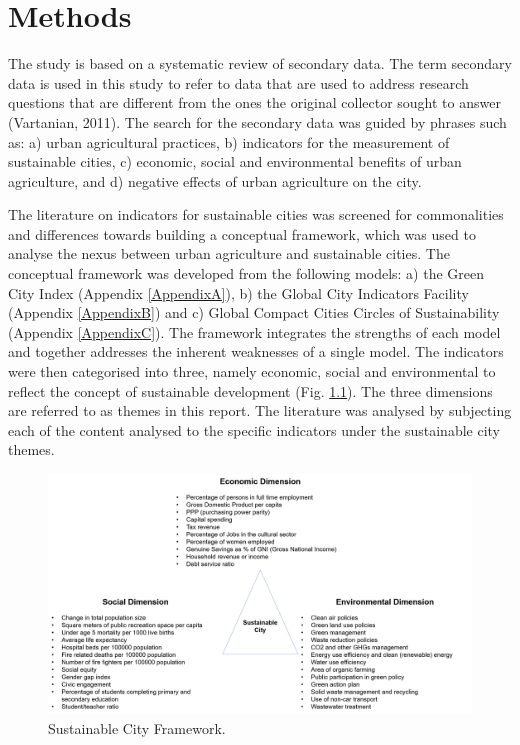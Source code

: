 \chapter{Methods} %

\label{Chapter:Methods}

The study is based on a systematic review of secondary data. The term secondary data is used in this study to refer to data that are used to address research questions that are different from the ones the original collector sought to answer (Vartanian, 2011). The search for the secondary data was guided by phrases such as: a) urban agricultural practices, b) indicators for the measurement of sustainable cities, c) economic, social and environmental benefits of urban agriculture, and d) negative effects of urban agriculture on the city. %

The literature on indicators for sustainable cities was screened for commonalities and differences towards building a conceptual framework, which was used to analyse the nexus between urban agriculture and sustainable cities. The conceptual framework was developed from the following models: a) the Green City Index (Appendix \ref{AppendixA}), b) the Global City Indicators Facility (Appendix \ref{AppendixB}) and c) Global Compact Cities Circles of Sustainability (Appendix \ref{AppendixC}). The framework integrates the strengths of each model and together addresses the inherent weaknesses of a single model. The indicators were then categorised into three, namely economic, social and environmental to reflect the concept of sustainable development (Fig. \ref{fig:sustainableCityFramework}). The three dimensions are referred to as themes in this report. The literature was analysed by subjecting each of the content analysed to the specific indicators under the sustainable city themes.

\begin{figure}[th]
\centering
\includegraphics[width=1.00\textwidth]{./Figures/sustainableCityFramework.png}
\decoRule
\caption[Sustainable City Framework]{Sustainable City Framework.}
\label{fig:sustainableCityFramework}
\end{figure}

